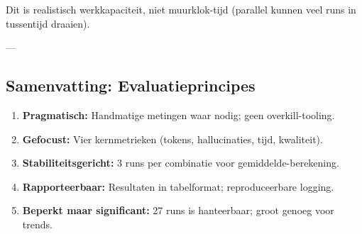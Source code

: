 \noindent
Dit is realistisch werkkapaciteit, niet muurklok-tijd (parallel kunnen veel runs in tussentijd draaien).

---

\subsection{Samenvatting: Evaluatieprincipes}

\begin{enumerate}
  \item \textbf{Pragmatisch:} Handmatige metingen waar nodig; geen overkill-tooling.
  \item \textbf{Gefocust:} Vier kernmetrieken (tokens, hallucinaties, tijd, kwaliteit).
  \item \textbf{Stabiliteitsgericht:} 3 runs per combinatie voor gemiddelde-berekening.
  \item \textbf{Rapporteerbaar:} Resultaten in tabelformat; reproduceerbare logging.
  \item \textbf{Beperkt maar significant:} 27 runs is hanteerbaar; groot genoeg voor trends.
\end{enumerate}